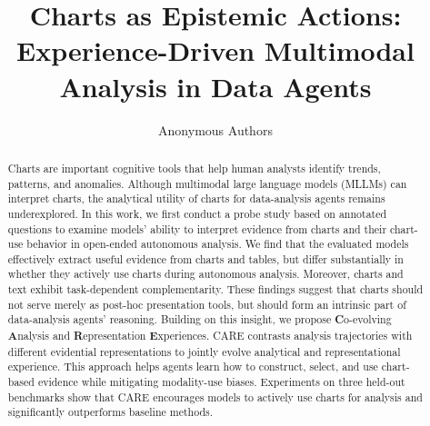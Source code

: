 \documentclass{article}
\title{Charts as Epistemic Actions: Experience-Driven Multimodal Analysis in Data Agents}
\author{Anonymous Authors}
\begin{document}
\maketitle

\begin{abstract}

  
  Charts are important cognitive tools that help human analysts identify trends, patterns, and anomalies. Although multimodal large language models (MLLMs) can interpret charts, the analytical utility of charts for data-analysis agents remains underexplored. In this work, we first conduct a probe study based on annotated questions to examine models' ability to interpret evidence from charts and their chart-use behavior in open-ended autonomous analysis. We find that the evaluated models effectively extract useful evidence from charts and tables, but differ substantially in whether they actively use charts during autonomous analysis. Moreover, charts and text exhibit task-dependent complementarity. These findings suggest that charts should not serve merely as post-hoc presentation tools, but should form an intrinsic part of data-analysis agents' reasoning. Building on this insight, we propose \textbf{C}o-evolving \textbf{A}nalysis and \textbf{R}epresentation \textbf{E}xperiences. \textsc{CARE} contrasts analysis trajectories with different evidential representations to jointly evolve analytical and representational experience. This approach helps agents learn how to construct, select, and use chart-based evidence while mitigating modality-use biases. Experiments on three held-out benchmarks show that \textsc{CARE} encourages models to actively use charts for analysis and significantly outperforms baseline methods.
\end{abstract}
\end{document}
